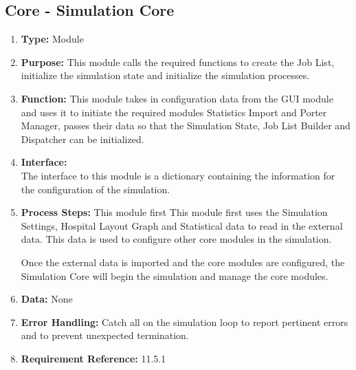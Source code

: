 \documentclass[paper=letter, fontsize=10pt]{scrartcl}
\numberwithin{equation}{section}		%
\numberwithin{figure}{section}			%
\numberwithin{table}{section}				%
\begin{document}
\subsection{Core - Simulation Core}
\begin{enumerate}[]
	\item \textbf{Type:} Module
	\item \textbf{Purpose:} This module calls the required functions to create the Job List, initialize the simulation state and initialize the simulation processes.
	\item \textbf{Function:} This module takes in configuration data from the GUI module and uses it to initiate the required modules Statistics Import and Porter Manager, passes their data so that the Simulation State, Job List Builder and Dispatcher can be initialized.
	\item \textbf{Interface:}\\ 
	The interface to this module is a dictionary containing the information for the configuration of the simulation.
	
	\item \textbf{Process Steps:} This module first
	This module first uses the Simulation Settings, Hospital Layout Graph and Statistical data to read in the external data.  This data is used to configure other core modules in the simulation.
	
	Once the external data is imported and the core modules are configured, the Simulation Core will begin the simulation and manage the core modules.
	\item \textbf{Data:} None
	\item \textbf{Error Handling:} Catch all on the simulation loop to report pertinent errors and to prevent unexpected termination. 
	\item \textbf{Requirement Reference:} 11.5.1
\end{enumerate}
\end{document}
